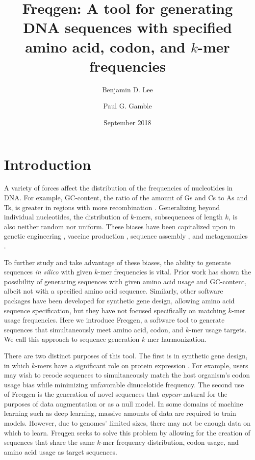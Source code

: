 \documentclass{article}
\title{Freqgen: A tool for generating DNA sequences with specified amino acid, codon, and $k$-mer frequencies}
\author[1,2]{Benjamin D. Lee}
\author[2]{Paul G. Gamble}
\affil[1]{School of Engineering and Applied Sciences, Harvard University, Cambridge, MA}
\affil[2]{Lab41, In-Q-Tel, Menlo Park, CA}
\date{September 2018}
\begin{document}
\maketitle


\begin{abstract}
\end{abstract}

\section{Introduction}
A variety of forces affect the distribution of the frequencies of nucleotides in DNA. For example, GC-content, the ratio of the amount of Gs and Cs to As and Ts, is greater in regions with more recombination \cite{Spencer2006}. Generalizing beyond individual nucleotides, the distribution of $k$-mers, subsequences of length $k$, is also neither random nor uniform. These biases have been capitalized upon in genetic engineering \cite{AlSaif2012}, vaccine production \cite{Tulloch2014}, sequence assembly \cite{Compeau2011}, and metagenomics \cite{Perry2010}. 

To further study and take advantage of these biases, the ability to generate sequences \textit{in silico} with given $k$-mer frequencies is vital. Prior work \cite{Liu2016} has shown the possibility of generating sequences with given amino acid usage and GC-content, albeit not with a specified amino acid sequence. Similarly, other software packages \cite{Gaspar2012, Guimaraes2014} have been developed for synthetic gene design, allowing amino acid sequence specification, but they have not focused specifically on matching $k$-mer usage frequencies. Here we introduce Freqgen, a software tool to generate sequences that simultaneously meet amino acid, codon, and $k$-mer usage targets. We call this approach to sequence generation $k$-mer harmonization.

There are two distinct purposes of this tool. The first is in synthetic gene design, in which $k$-mers have a significant role on protein expression \cite{AlSaif2012}. For example, users may wish to recode sequences to simultaneously match the host organism's codon usage bias while minimizing unfavorable dinucelotide frequency. The second use of Freqgen is the generation of novel sequences that \textit{appear} natural for the purposes of data augmentation or as a null model\cite{Liu2016}. In some domains of machine learning such as deep learning, massive amounts of data are required to train models. However, due to genomes' limited sizes, there may not be enough data on which to learn. Freqgen seeks to solve this problem by allowing for the creation of sequences that share the same $k$-mer frequency distribution, codon usage, and amino acid usage as target sequences.
\end{document}
